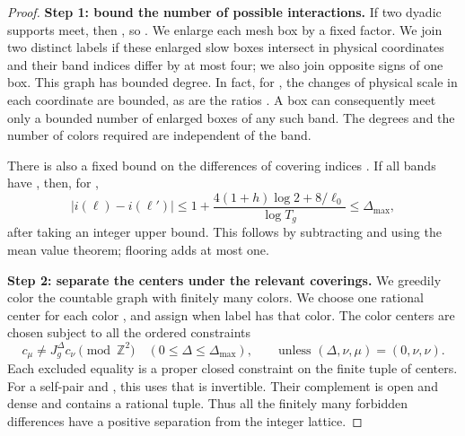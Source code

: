 \begin{proof}
\textbf{Step 1: bound the number of possible interactions.} If two dyadic supports meet, then , so . We enlarge each mesh box by a fixed factor. We join two distinct labels if these enlarged slow boxes intersect in physical coordinates and their band indices differ by at most four; we also join opposite signs of one box. This graph has
%
bounded degree. In fact, for , the changes of physical scale in each coordinate are bounded, as are the ratios . A box can consequently meet only a bounded number of enlarged boxes of any such band. The degrees and the number of colors required are independent of the band.

There is also a fixed bound on the differences of covering indices . If all bands have , then, for ,
\begin{equation}
 |i(\ell)-i(\ell')|
 \le 1+\frac{4(1+h)\log2+8/\ell_0}{\log T_g}
 \le\Delta_{\max},
 \tag{6.14}\label{eq:6.14}
\end{equation}
after taking an integer upper bound. This follows by subtracting  and using the mean value theorem; flooring adds at most one.

\textbf{Step 2: separate the centers under the relevant coverings.} We greedily color the countable graph with finitely many colors. We choose one rational center  for each color , and assign  when label  has that color. The color centers are chosen subject to all the ordered constraints
\begin{equation}
 c_\mu\ne J_g^\Delta c_\nu\pmod{\mathbb Z^2}
 \quad (0\le\Delta\le\Delta_{\max}),
 \qquad
 \text{unless }(\Delta,\nu,\mu)=(0,\nu,\nu).
 \tag{6.15}\label{eq:6.15}
\end{equation}
Each excluded equality is a proper closed constraint on the finite tuple of centers. For a self-pair and , this uses that  is invertible. Their complement is open and dense and contains a rational tuple. Thus all the finitely many forbidden differences have a positive separation from the integer lattice.


\end{proof}
